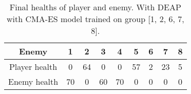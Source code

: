\begin{table}[ht]\centering
\begin{tabular}{|c|c|c|c|c|c|c|c|c|}
\hline
Enemy & 1 & 2 & 3 & 4 & 5 & 6 & 7 & 8\\
\hline
Player health & 0 & 64 & 0 & 0 & 57 & 2 & 23 & 5\\
\hline
Enemy health & 70 & 0 & 60 & 70 & 0 & 0 & 0 & 0\\
\hline
\end{tabular}
\caption{Final healths of player and enemy. With DEAP with CMA-ES  model trained on group [1, 2, 6, 7, 8].}
\label{tab:test_DEAP_1_2_6_7_8}
\end{table}